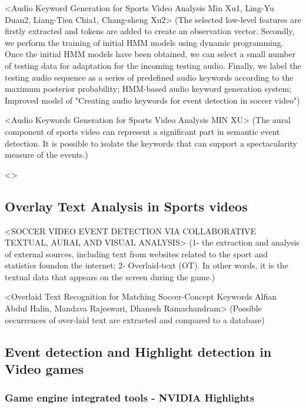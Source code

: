     

<Audio Keyword Generation for Sports Video Analysis Min Xu1, Ling-Yu Duan2, Liang-Tien Chia1, Chang-sheng Xu2> (The selected low-level features are firstly extracted and tokens are added to create an observation vector. Secondly, we perform the training of initial HMM models using dynamic programming. Once the initial HMM models have been obtained, we can select a small number of testing data for adaptation for the incoming testing audio. Finally, we label the testing audio sequence as a series of predefined audio keywords according to the maximum posterior probability; HMM-based audio keyword generation system; Improved model of "Creating audio keywords for event detection in soccer video")

<Audio Keywords Generation for Sports Video Analysis MIN XU> (The aural component of sports video can represent a significant part in semantic event detection. It is possible to isolate the keywords that can support a spectacularity measure of the events.)

<>
\subsection{Overlay Text Analysis in Sports videos}

<SOCCER VIDEO EVENT DETECTION VIA COLLABORATIVE TEXTUAL, AURAL AND VISUAL ANALYSIS> (1- the extraction and
analysis of external sources, including text from websites related to the sport and statistics
foundon the internet; 2- Overlaid-text (OT). In other words, it is the textual data that appears on the screen
during the game.)

<Overlaid Text Recognition for Matching Soccer-Concept Keywords Alfian Abdul Halin, Mandava Rajeswari, Dhanesh Ramachandram> (Possible occurrences of over-laid text are extracted and compared to a database)


\subsection{Event detection and Highlight detection in Video games}

\subsubsection{}

\subsubsection{Game engine integrated tools - NVIDIA Highlights}


